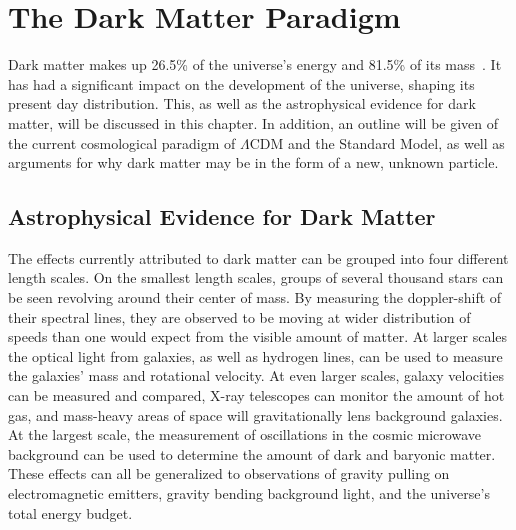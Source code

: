 \cleartooddpage[\thispagestyle{empty}]
\newcommand{\thetamc}{\theta_{\textrm{MC}}}
\newcommand{\mlratio}{$\left [ \frac{\textrm{M}_\odot}{\textrm{L}_\odot} \right ]$}
\chapter{The Dark Matter Paradigm}\label{ch_dm}

Dark matter makes up 26.5\% of the universe's energy and 81.5\% of its mass~\cite{planck2015}.
It has had a significant impact on the development of the universe, shaping its present day distribution.
This, as well as the astrophysical evidence for dark matter, will be discussed in this chapter.
In addition, an outline will be given of the current cosmological paradigm of $\Lambda$CDM and the Standard Model, as well as arguments for why dark matter may be in the form of a new, unknown particle.



\section{Astrophysical Evidence for Dark Matter}
  
The effects currently attributed to dark matter can be grouped into four different length scales.
On the smallest length scales, groups of several thousand stars can be seen revolving around their center of mass.
By measuring the doppler-shift of their spectral lines, they are observed to be moving at wider distribution of speeds than one would expect from the visible amount of matter.
At larger scales the optical light from galaxies, as well as hydrogen lines, can be used to measure the galaxies' mass and rotational velocity.
At even larger scales, galaxy velocities can be measured and compared, X-ray telescopes can monitor the amount of hot gas, and mass-heavy areas of space will gravitationally lens background galaxies.
At the largest scale, the measurement of oscillations in the cosmic microwave background can be used to determine the amount of dark and baryonic matter.
These effects can all be generalized to observations of gravity pulling on electromagnetic emitters, gravity bending background light, and the universe's total energy budget.

